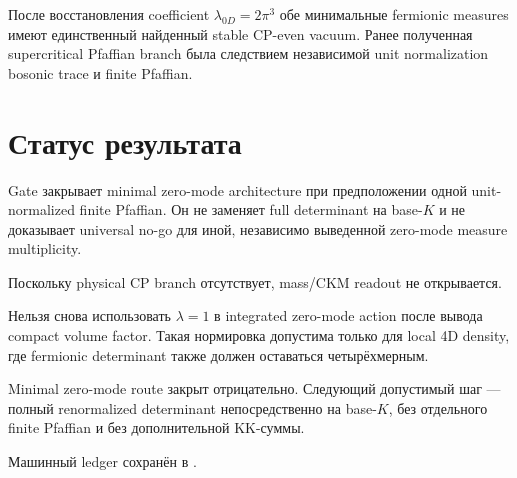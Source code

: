 \begin{theorem}
После восстановления coefficient $\lambda_{0D}=2\pi^3$ обе минимальные
fermionic measures имеют единственный найденный stable CP-even vacuum.
Ранее полученная supercritical Pfaffian branch была следствием независимой
unit normalization bosonic trace и finite Pfaffian.
\end{theorem}

\section{Статус результата}

Gate закрывает minimal zero-mode architecture при предположении одной
unit-normalized finite Pfaffian. Он не заменяет full determinant на base-$K$
и не доказывает universal no-go для иной, независимо выведенной zero-mode
measure multiplicity.

Поскольку physical CP branch отсутствует, mass/CKM readout не открывается.

\begin{nogocriterion}
Нельзя снова использовать $\lambda=1$ в integrated zero-mode action после
вывода compact volume factor. Такая нормировка допустима только для local 4D
density, где fermionic determinant также должен оставаться четырёхмерным.
\end{nogocriterion}

\begin{protocol}
Minimal zero-mode route закрыт отрицательно. Следующий допустимый шаг ---
полный renormalized determinant непосредственно на base-$K$, без отдельного
finite Pfaffian и без дополнительной KK-суммы.
\end{protocol}

Машинный ledger сохранён в
.